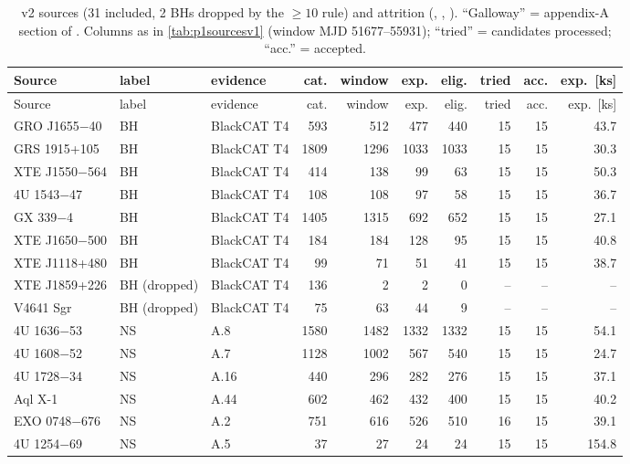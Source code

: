 {\footnotesize\setlength{\tabcolsep}{3.5pt}
\begin{longtable}{@{}lllrrrrrrr@{}}
\caption[v2 sources and attrition]{v2 sources (31 included, 2 BHs dropped by the $\ge10$ rule) and attrition
(, , ). ``Galloway''
= appendix-A section of \citet{Galloway2008}. Columns as in \cref{tab:p1sourcesv1} (window MJD 51677--55931); ``tried'' =
candidates processed; ``acc.'' = accepted.}\label{tab:p1sourcesv2}\\
\toprule
Source & label & evidence & cat. & window & exp. & elig. & tried & acc. & exp.\ [ks] \\
\midrule\endfirsthead
\toprule Source & label & evidence & cat. & window & exp. & elig. & tried & acc. & exp.\ [ks] \\ \midrule\endhead
\bottomrule\endfoot
GRO J1655$-$40 & BH & BlackCAT T4 & 593 & 512 & 477 & 440 & 15 & 15 & 43.7 \\
GRS 1915+105 & BH & BlackCAT T4 & 1809 & 1296 & 1033 & 1033 & 15 & 15 & 30.3 \\
XTE J1550$-$564 & BH & BlackCAT T4 & 414 & 138 & 99 & 63 & 15 & 15 & 50.3 \\
4U 1543$-$47 & BH & BlackCAT T4 & 108 & 108 & 97 & 58 & 15 & 15 & 36.7 \\
GX 339$-$4 & BH & BlackCAT T4 & 1405 & 1315 & 692 & 652 & 15 & 15 & 27.1 \\
XTE J1650$-$500 & BH & BlackCAT T4 & 184 & 184 & 128 & 95 & 15 & 15 & 40.8 \\
XTE J1118+480 & BH & BlackCAT T4 & 99 & 71 & 51 & 41 & 15 & 15 & 38.7 \\
XTE J1859+226 & BH (dropped) & BlackCAT T4 & 136 & 2 & 2 & 0 & -- & -- & -- \\
V4641 Sgr & BH (dropped) & BlackCAT T4 & 75 & 63 & 44 & 9 & -- & -- & -- \\
4U 1636$-$53 & NS & A.8 & 1580 & 1482 & 1332 & 1332 & 15 & 15 & 54.1 \\
4U 1608$-$52 & NS & A.7 & 1128 & 1002 & 567 & 540 & 15 & 15 & 24.7 \\
4U 1728$-$34 & NS & A.16 & 440 & 296 & 282 & 276 & 15 & 15 & 37.1 \\
Aql X-1 & NS & A.44 & 602 & 462 & 432 & 400 & 15 & 15 & 40.2 \\
EXO 0748$-$676 & NS & A.2 & 751 & 616 & 526 & 510 & 16 & 15 & 39.1 \\
4U 1254$-$69 & NS & A.5 & 37 & 27 & 24 & 24 & 15 & 15 & 154.8 \\

\end{longtable}}
